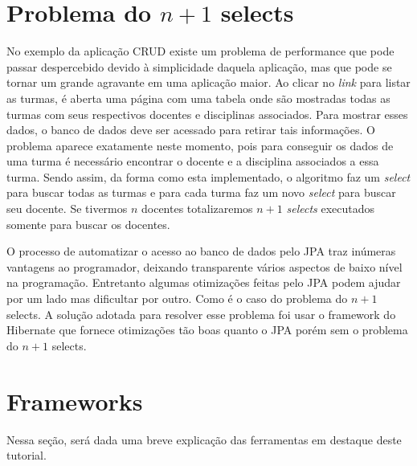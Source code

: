 \documentclass[12pt,a4paper]{article}
\begin{document}
\section{Problema do $n+1$ selects}
No exemplo da aplicação CRUD existe um problema de performance que pode passar despercebido devido à simplicidade daquela aplicação, mas que pode se tornar um grande agravante em uma aplicação maior. Ao clicar no \textit{link} para listar as turmas, é aberta uma página com uma tabela onde são mostradas todas as turmas com seus respectivos docentes e disciplinas associados. Para mostrar esses dados, o banco de dados deve ser acessado para retirar tais informações. O problema aparece exatamente neste momento, pois para conseguir os dados de uma turma é necessário encontrar o docente e a disciplina associados a essa turma. Sendo assim, da forma como esta implementado, o algoritmo faz um \textit{select} para buscar todas as turmas e para cada turma faz um novo \textit{select} para buscar seu docente. Se tivermos $n$ docentes totalizaremos $n+1$ \textit{selects} executados somente para buscar os docentes.

O processo de automatizar o acesso ao banco de dados pelo JPA traz inúmeras vantagens ao programador, deixando transparente vários aspectos de baixo nível na programação. Entretanto algumas otimizações feitas pelo JPA podem ajudar por um lado mas dificultar por outro. Como é o caso do problema do $n+1$ selects. A solução adotada para resolver esse problema foi usar o framework do Hibernate que fornece otimizações tão boas quanto o JPA porém sem o problema do $n+1$ selects. 



%
\newpage
\section{Frameworks}
Nessa seção, será dada uma breve explicação das ferramentas em destaque deste tutorial.
\end{document}
